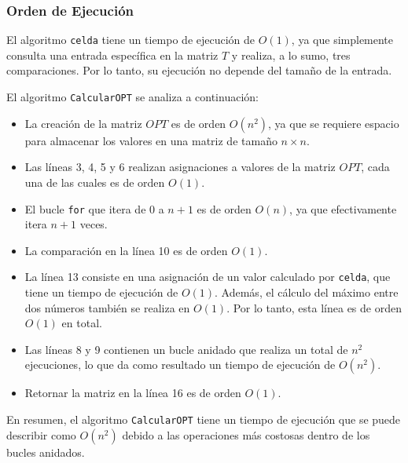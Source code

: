 \subsubsection{Orden de Ejecución}

El algoritmo \texttt{celda} tiene un tiempo de ejecución de $O(1)$, ya que simplemente consulta una entrada específica en la matriz $T$ y realiza, a lo sumo, tres comparaciones. Por lo tanto, su ejecución no depende del tamaño de la entrada.

El algoritmo \texttt{CalcularOPT} se analiza a continuación:

\begin{itemize}
	\item La creación de la matriz $OPT$ es de orden $O(n^2)$,
	      ya que se requiere espacio para almacenar los valores en una matriz de tamaño $n \times n$.
	\item Las líneas 3, 4, 5 y 6 realizan asignaciones a valores de la matriz $OPT$,
	      cada una de las cuales es de orden $O(1)$.
	\item El bucle \texttt{for} que itera de 0 a $n+1$ es de orden $O(n)$, ya que efectivamente itera $n+1$ veces.
	\item La comparación en la línea 10 es de orden $O(1)$.
	\item La línea 13 consiste en una asignación de un valor calculado por \texttt{celda},
	      que tiene un tiempo de ejecución de $O(1)$. Además, el cálculo del máximo entre dos números
	      también se realiza en $O(1)$. Por lo tanto, esta línea es de orden $O(1)$ en total.
	\item Las líneas 8 y 9 contienen un bucle anidado que realiza un total de $n^2$ ejecuciones,
	      lo que da como resultado un tiempo de ejecución de $O(n^2)$.
	\item Retornar la matriz en la línea 16 es de orden $O(1)$.
\end{itemize}

En resumen, el algoritmo \texttt{CalcularOPT} tiene un tiempo de ejecución que se puede describir
como $O(n^2)$ debido a las operaciones más costosas dentro de los bucles anidados.

\newpage
